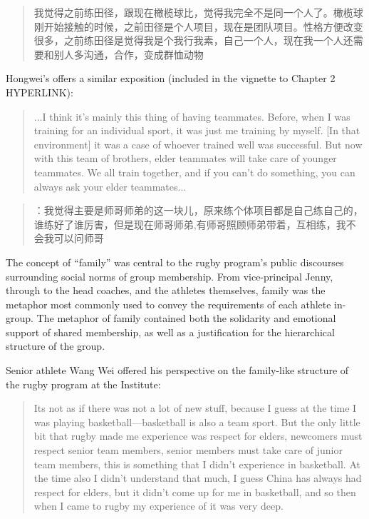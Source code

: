 \begin{CJK}{UTF8}{gbsn}
      \begin{quotation}
        我觉得之前练田径，跟现在橄榄球比，觉得我完全不是同一个人了。橄榄球刚开始接触的时候，之前田径是个人项目，现在是团队项目。性格方便改变很多，之前练田径是觉得我是个我行我素，自己一个人，现在我一个人还需要和别人多沟通，合作，变成群恤动物
      \end{quotation}

Hongwei's offers a similar exposition (included in the vignette to Chapter 2 HYPERLINK):

    \begin{quotation}
      ...I think it's mainly this thing of having teammates. Before, when I was training for an individual sport, it was just me training by myself. [In that environment] it was a case of whoever trained well was successful.  But now with this team of brothers, elder teammates will take care of younger teammates. We all train together, and if you can’t do something, you can always ask your elder teammates...
    \end{quotation}

      \begin{quotation}
        ：我觉得主要是师哥师弟的这一块儿，原来练个体项目都是自己练自己的，谁练好了谁厉害，但是现在师哥师弟,有师哥照顾师弟带着，互相练，我不会我可以问师哥
      \end{quotation}





  The concept of ``family'' was central to the rugby program's public discourses surrounding social norms of group membership. From vice-principal Jenny, through to the head coaches, and the athletes themselves, family was the metaphor most commonly used to convey the requirements of each athlete in-group.  The metaphor of family contained both the solidarity and emotional support of shared membership, as well as a justification for the hierarchical structure of the group.

  Senior athlete Wang Wei offered his perspective on the family-like structure of the rugby program at the Institute:

      \begin{quotation}
        Its not as if there was not a lot of new stuff, because I guess at the time I was playing basketball---basketball is also a team sport.  But the only little bit that rugby made me experience was respect for elders, newcomers must respect senior team members, senior members must take care of junior team members, this is something that I didn’t experience in basketball.  At the time also I didn’t understand that much, I guess China has always had respect for elders, but it didn’t come up for me in basketball, and so then when I came to rugby my experience of it was very deep.
      \end{quotation}


\end{CJK}
